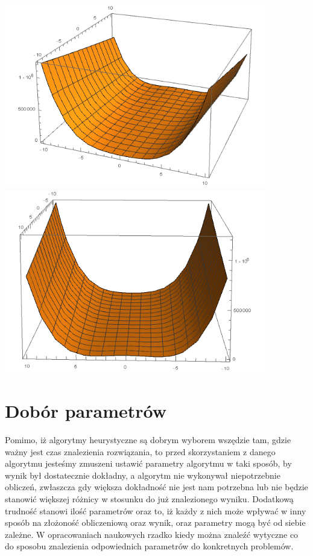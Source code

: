 \documentclass[twoside]{projektInzynierskiMS1}
\newcommand{\si}{ś}
\begin{document}
\includegraphics[height=8cm]{rosenbrockFunction1.png}\\
\includegraphics[height=8cm]{rosenbrockFunction2.png}\\

\section{Dobór parametrów}
Pomimo, iż algorytmy heurystyczne są dobrym wyborem wszędzie tam, gdzie ważny jest czas znalezienia rozwiązania, to przed skorzystaniem z danego algorytmu jeste\si my zmuszeni ustawić parametry algorytmu w taki sposób, by wynik był dostatecznie dokładny, a algorytm nie wykonywał niepotrzebnie obliczeń, zwłaszcza gdy większa dokładno\si ć nie jest nam potrzebna lub nie będzie stanowić większej różnicy w stosunku do już znalezionego wyniku. Dodatkową trudno\si ć stanowi ilo\si ć parametrów oraz to, iż każdy z nich może wpływać w inny sposób na złożono\si ć obliczeniową oraz wynik, oraz parametry mogą być od siebie zależne. W opracowaniach naukowych rzadko kiedy można znaleźć wytyczne co do sposobu znalezienia odpowiednich parametrów do konkretnych problemów. \\
\end{document}
